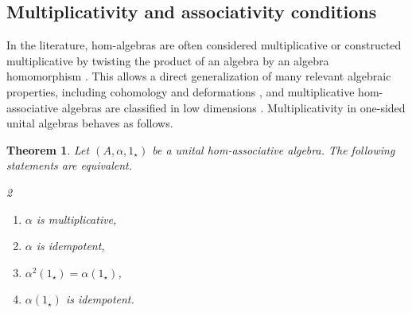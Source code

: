\documentclass[12pt]{article}
\newtheorem{theorem}{Theorem}
\begin{document}
		\subsection{Multiplicativity and associativity conditions}\label{ssec:multiplicativity}
		In the literature, hom-algebras are often considered multiplicative \cite{AmmEjbMak:cohomology,MakZah:HAclassification,ArfFraMak:morphisms,Mak:HomAltHomJordan} or constructed multiplicative by twisting the product of an algebra by an algebra homomorphism \cite{BackRic:HAWeyl,BackRicSil:HAOreWeakUnit,Yau:HAhomology}. This allows a direct generalization of many relevant algebraic properties, including cohomology \cite{AmmEjbMak:cohomology} and deformations \cite{ArfFraMak:morphisms}, and multiplicative hom-associative algebras are classified in low dimensions \cite{MakZah:HAclassification}.
		Multiplicativity in one-sided unital algebras behaves as follows.
		\begin{theorem}\label{thm:unital_multiplicativity}
			Let $(A,\alpha,1_\star)$ be a unital hom-associative algebra. The following statements are equivalent.
			\begin{multicols}{2}
				\begin{enumerate}[label=\textnormal{\arabic*)},ref=\textnormal{\arabic*}]
					\item\label{eq:mult_cond_1} $\alpha$ is multiplicative,
					\item\label{eq:mult_cond_2} $\alpha$ is idempotent,
					\item\label{eq:mult_cond_3} $\alpha^2(1_\star)=\alpha(1_\star)$,
					\item\label{eq:mult_cond_4} $\alpha(1_\star)$ is idempotent.
				\end{enumerate}
			\end{multicols}
		\end{theorem}
\end{document}
